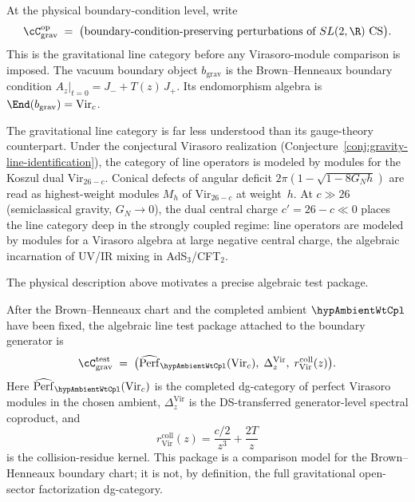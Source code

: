 \begin{definition}
\label{def:grav-open-category}
At the physical boundary-condition level, write
\begin{equation}\label{eq:grav-open-category}
\cC_{\mathrm{grav}}^{\mathrm{op}}
\;=\;
\bigl(
 \text{boundary-condition-preserving perturbations of
 $SL(2,\R)$ CS}
\bigr).
\end{equation}
This is the gravitational line category before any Virasoro-module
comparison is imposed.
The vacuum boundary object $b_{\mathrm{grav}}$ is the
Brown--Henneaux boundary condition
$A_z|_{t=0} = J_- + T(z)\,J_+$.
Its endomorphism algebra is
$\End(b_{\mathrm{grav}}) = \mathrm{Vir}_c$.
\end{definition}

The gravitational line category is far less understood than
its gauge-theory counterpart.
Under the conjectural Virasoro realization
(Conjecture~\ref{conj:gravity-line-identification}), the category of line
operators is modeled by modules for the Koszul dual
$\mathrm{Vir}_{26-c}$.
Conical defects of angular deficit $2\pi(1 - \sqrt{1 - 8G_Nh})$
are read as highest-weight modules $M_h$ of
$\mathrm{Vir}_{26-c}$ at weight~$h$.
At $c \gg 26$ (semiclassical gravity, $G_N \to 0$), the dual
central charge $c' = 26 - c \ll 0$ places the line
category deep in the strongly coupled regime: line operators
are modeled by modules for a Virasoro algebra at large negative
central charge, the algebraic incarnation of UV/IR mixing in
AdS$_3$/CFT$_2$.

The physical description above motivates a precise algebraic test
package.

\begin{definition}
\label{def:grav-open-algebraic}
After the Brown--Henneaux chart and the completed ambient
\(\hypAmbientWtCpl\) have been fixed, the algebraic line test package
attached to the boundary generator is
\begin{equation}\label{eq:grav-open-algebraic}
\cC_{\mathrm{grav}}^{\mathrm{test}}
\;=\;
\bigl(
\widehat{\mathrm{Perf}}_{\hypAmbientWtCpl}(\mathrm{Vir}_c),\;
\Delta_z^{\mathrm{Vir}},\;
r_{\mathrm{Vir}}^{\mathrm{coll}}(z)
\bigr).
\end{equation}
Here
\(\widehat{\mathrm{Perf}}_{\hypAmbientWtCpl}(\mathrm{Vir}_c)\) is the
completed dg-category of perfect Virasoro modules in the chosen
ambient, \(\Delta_z^{\mathrm{Vir}}\) is the DS-transferred
generator-level spectral coproduct, and
\[
r_{\mathrm{Vir}}^{\mathrm{coll}}(z)
=\frac{c/2}{z^3}+\frac{2T}{z}
\]
is the collision-residue kernel.  This package is a comparison model
for the Brown--Henneaux boundary chart; it is not, by definition, the
full gravitational open-sector factorization dg-category.
\end{definition}

